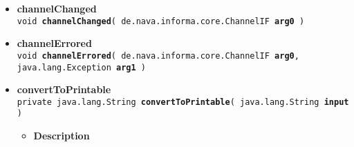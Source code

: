 {{{\begin{itemize}
{\begin{itemize}
{When a message comes in, this method is called on the set implementer of this interface.
}
\item{
{\bf Parameters}
  \begin{itemize}
   \item{
{\tt msg} -- }
  \end{itemize}
}%
\item{{\bf Returns} -- 
true if the message was handled, false if it wasn't 
}%
\end{itemize}
}%
 \item{ 
{\bf channelChanged}\\
{\tt  void\ {\bf channelChanged}( {\tt de.nava.informa.core.ChannelIF} {\bf arg0} )
\label{amber.crawler.RSS.channelChanged(de.nava.informa.core.ChannelIF)}}%
}%
 \item{ 
{\bf channelErrored}\\
{\tt  void\ {\bf channelErrored}( {\tt de.nava.informa.core.ChannelIF} {\bf arg0},
{\tt java.lang.Exception} {\bf arg1} )
\label{amber.crawler.RSS.channelErrored(de.nava.informa.core.ChannelIF, java.lang.Exception)}}%
}%
 \item{ 
{\bf convertToPrintable}\\
{\tt private java.lang.String\ {\bf convertToPrintable}( {\tt java.lang.String} {\bf input} )
\label{amber.crawler.RSS.convertToPrintable(java.lang.String)}}%
\begin{itemize}
\item{
{\bf Description}

}
\end{itemize}}
\end{itemize}}}}
